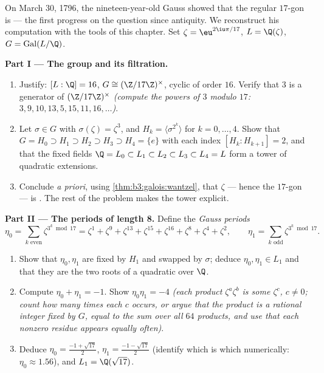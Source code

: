 \begin{problem}\label{pb:b3:galois:1}
On March 30, 1796, the nineteen-year-old Gauss showed that the
regular $17$-gon is  --- the first progress on the
question since antiquity. We reconstruct his computation with the
tools of this chapter. Set $\zeta = \eu^{2\iu\pi/17}$, $L =
\Q(\zeta)$, $G = \operatorname{Gal}(L/\Q)$.

\medskip
\noindent\textbf{Part I --- The group and its filtration.}
\begin{enumerate}
  \item Justify: $[L:\Q] = 16$, $G \cong (\Z/17\Z)^\times$,
        cyclic of order $16$. Verify that $3$ is a generator of
        $(\Z/17\Z)^\times$ \emph{(compute the powers of $3$
        modulo $17$: $3, 9, 10, 13, 5, 15, 11, 16, \dots$)}.
  \item Let $\sigma \in G$ with $\sigma(\zeta) = \zeta^3$, and
        $H_k = \langle \sigma^{2^k}\rangle$ for $k = 0, \dots,
        4$. Show that $G = H_0 \supset H_1 \supset H_2 \supset
        H_3 \supset H_4 = \{e\}$ with each index $[H_k :
        H_{k+1}] = 2$, and that the fixed fields $\Q = L_0
        \subset L_1 \subset L_2 \subset L_3 \subset L_4 = L$
        form a tower of quadratic extensions.
  \item Conclude \emph{a priori}, using
        \cref{thm:b3:galois:wantzel}, that $\zeta$ --- hence the
        $17$-gon --- is . The rest of the problem
        makes the tower explicit.
\end{enumerate}

\medskip
\noindent\textbf{Part II --- The periods of length 8.}
Define the \emph{Gauss periods}
\[
\eta_0 = \sum_{k \text{ even}} \zeta^{3^k \bmod 17}
= \zeta^{1} + \zeta^{9} + \zeta^{13} + \zeta^{15} + \zeta^{16} +
\zeta^{8} + \zeta^{4} + \zeta^{2},
\qquad
\eta_1 = \sum_{k \text{ odd}} \zeta^{3^k \bmod 17}.
\]
\begin{enumerate}[resume]
  \item Show that $\eta_0, \eta_1$ are fixed by $H_1$ and swapped
        by $\sigma$; deduce $\eta_0, \eta_1 \in L_1$ and that
        they are the two roots of a quadratic over $\Q$.
  \item Compute $\eta_0 + \eta_1 = -1$. Show $\eta_0\eta_1 = -4$
        \emph{(each product $\zeta^a\zeta^b$ is some $\zeta^c$,
        $c \neq 0$; count how many times each $c$ occurs, or
        argue that the product is a rational integer fixed by
        $G$, equal to the sum over all $64$ products, and use
        that each nonzero residue appears equally often)}.
  \item Deduce $\eta_0 = \frac{-1 + \sqrt{17}}2$, $\eta_1 =
        \frac{-1-\sqrt{17}}2$ (identify which is which
        numerically: $\eta_0 \approx 1.56$), and $L_1 =
        \Q(\sqrt{17})$.
\end{enumerate}


\end{problem}
